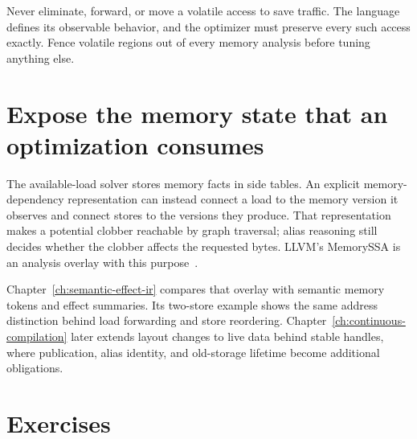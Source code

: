 \begin{ccwarning}
Never eliminate, forward, or move a volatile access to save traffic.
The language defines its observable behavior, and the optimizer must preserve every such access exactly.
Fence volatile regions out of every memory analysis before tuning anything else.
\end{ccwarning}

\section{Expose the memory state that an optimization consumes}
\label{sec:ch21-memory-ir-link}

The available-load solver stores memory facts in side tables.
An explicit memory-dependency representation can instead connect a load to the memory version it observes and connect stores to the versions they produce.
That representation makes a potential clobber reachable by graph traversal; alias reasoning still decides whether the clobber affects the requested bytes.
LLVM's MemorySSA is an analysis overlay with this purpose~\cite{llvm-2026-memoryssa}.

Chapter~\ref{ch:semantic-effect-ir} compares that overlay with semantic memory tokens and effect summaries.
Its two-store example shows the same address distinction behind load forwarding and store reordering.
Chapter~\ref{ch:continuous-compilation} later extends layout changes to live data behind stable handles, where publication, alias identity, and old-storage lifetime become additional obligations.

\section{Exercises}
\label{sec:ch21-exercises}

